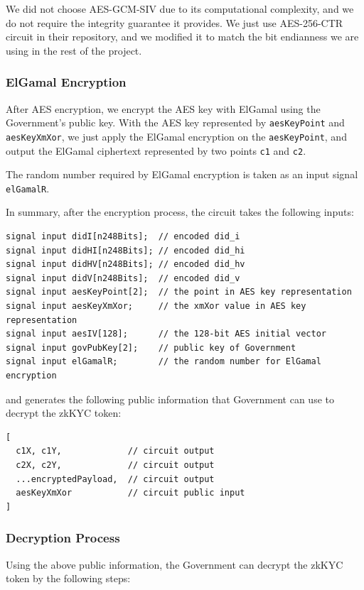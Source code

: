 \documentclass[
]{report}
\begin{document}
We did not choose AES-GCM-SIV due to its computational complexity, and
we do not require the integrity guarantee it provides. We just use
AES-256-CTR circuit in their repository, and we modified it to match the
bit endianness we are using in the rest of the project.

\subsubsection{ElGamal Encryption}

After AES encryption, we encrypt the AES key with ElGamal using the
Government's public key. With the AES key represented by
\texttt{aesKeyPoint} and \texttt{aesKeyXmXor}, we just apply the ElGamal
encryption on the \texttt{aesKeyPoint}, and output the ElGamal
ciphertext represented by two points \texttt{c1} and \texttt{c2}.

The random number required by ElGamal encryption is taken as an input
signal \texttt{elGamalR}.

In summary, after the encryption process, the circuit takes the
following inputs:

\begin{verbatim}
signal input didI[n248Bits];  // encoded did_i
signal input didHI[n248Bits]; // encoded did_hi
signal input didHV[n248Bits]; // encoded did_hv
signal input didV[n248Bits];  // encoded did_v
signal input aesKeyPoint[2];  // the point in AES key representation
signal input aesKeyXmXor;     // the xmXor value in AES key representation
signal input aesIV[128];      // the 128-bit AES initial vector
signal input govPubKey[2];    // public key of Government
signal input elGamalR;        // the random number for ElGamal encryption
\end{verbatim}

and generates the following public information that Government can use
to decrypt the zkKYC token:

\begin{verbatim}
[
  c1X, c1Y,             // circuit output
  c2X, c2Y,             // circuit output
  ...encryptedPayload,  // circuit output
  aesKeyXmXor           // circuit public input
]
\end{verbatim}

\subsubsection{Decryption Process}

Using the above public information, the Government can decrypt the zkKYC
token by the following steps:
\end{document}
